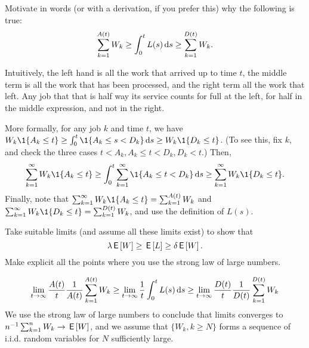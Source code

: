 \begin{exercise}
  Motivate in words (or with a derivation, if you prefer this) why the following is true:
  \begin{equation*}
    \sum_{k=1}^{A(t)} W_k \geq \int_0^t L(s) \,\text{d}s \geq  \sum_{k=1}^{D(t)} W_k.
  \end{equation*}
\begin{solution}
  Intuitively, the left hand is all the work that arrived up to time $t$, the middle term is all the work that has been processed, and the right term all the work that left.
  Any job that that is half way its service counts for full at the left, for half in the middle expression, and not  in the right.

  More formally, for any job $k$ and time $t$, we have $W_k \1{A_k \leq t} \geq \int_0^t \1{A_k \leq s < D_k } \d s \geq W_k \1{D_k \leq t}$. (To see this, fix $k$, and check the three cases $t < A_k, A_k \leq t < D_k, D_k < t$.) Then,
  \begin{equation*}
    \sum_{k=1}^\infty W_k \1{A_k \leq t} \geq \int_0^t \sum_{k=1}^\infty \1{A_k \leq t < D_k} \d s \geq \sum_{k=1}^\infty W_k \1{D_k \leq t}. 
  \end{equation*}
  Finally, note that $ \sum_{k=1}^\infty W_k \1{A_k \leq t} = \sum_{k=1}^{A(t)} W_k$ and $ \sum_{k=1}^\infty W_k \1{D_k \leq t} = \sum_{k=1}^{D(t)} W_k$, and use the definition of $L(s)$.
\end{solution}
\end{exercise}

\begin{exercise}
Take suitable limits (and assume all these limits exist) to show that 
  \begin{equation*}
\lambda \,\mathsf{E}\left[W\right]  \geq \,\mathsf{E}\left[L\right] \geq  \delta \,\mathsf{E}\left[W\right].
  \end{equation*}
  Make explicit all the points where you use the strong law of large numbers.
\begin{solution}
  \begin{equation*}
    \lim_{t\to\infty} \frac{A(t)}{t}\frac 1{A(t)}\sum_{k=1}^{A(t)} W_k \geq \lim_{t\to \infty} \frac 1 t \int_0^t L(s) \,\text{d}s \geq      \lim_{t\to\infty} \frac{D(t)}{t}\frac 1{D(t)} \sum_{k=1}^{D(t)} W_k 
  \end{equation*}
  We use the strong law of large numbers to conclude that limits converges to $n^{-1} \sum_{k=1}^n W_k \to \,\mathsf{E}\left[W\right]$, and we assume that $\{W_k, k\geq N\}$ forms a sequence of i.i.d.
  random variables for $N$ sufficiently large.
\end{solution}
\end{exercise}


